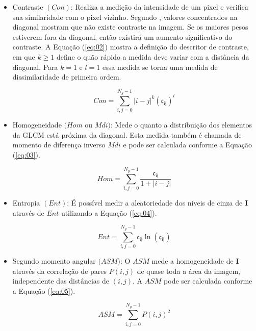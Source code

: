 \documentclass[a4paper]{ifacconf}
\begin{document}
\begin{itemize}
    \item Contraste $(Con)$: Realiza a medição da intensidade de um pixel e verifica sua similaridade com o pixel vizinho. Segundo \citep{Ramalho2013}, valores concentrados na diagonal mostram que não existe contraste na imagem. Se os maiores pesos estiverem fora da diagonal, então existirá um aumento significativo do contraste. A Equação (\ref{eq:02}) mostra a definição do descritor de contraste, em que $k \geq 1$ define o quão rápido a medida deve variar com a distância
    da diagonal. Para $k = 1$ e $l = 1$ essa medida se torna uma medida de dissimilaridade de primeira ordem.

    \begin{equation}\label{eq:02}
	    Con = \sum_{i,j = 0}^{N_g - 1} |i-j|^k (\mathfrak{c_{ij}})^l\
    \end{equation}   
 
    \item Homogeneidade $(Hom$ ou $Mdi)$: Mede o quanto a distribuição dos elementos da GLCM está próxima da diagonal. Esta medida também é chamada de momento de diferença inverso $Mdi$ e pode ser calculada conforme a Equação (\ref{eq:03}).
    
    \begin{equation}\label{eq:03}
	    Hom = \sum_{i,j = 0}^{N_g - 1} \frac{\mathfrak{c_{ij}}}{1 + |i-j|}\
    \end{equation}
    
    \item Entropia $(Ent)$: É possível medir a aleatoriedade dos níveis de cinza de \textbf{I} através de $Ent$ utilizando a Equação (\ref{eq:04}). 
    
     \begin{equation}\label{eq:04}
	    Ent = \sum_{i,j = 0}^{N_g - 1}{\mathfrak{c_{ij}}}\ln({\mathfrak{c_{ij}}})\
    \end{equation}
    
    \item Segundo momento angular $(ASM$): O $ASM$ mede a homogeneidade de \textbf{I} através da correlação de pares $P(i,j)$ de quase toda a área da imagem, independente das distâncias de $(i,j)$. A $ASM$ pode ser calculada conforme a Equação (\ref{eq:05}).
    
     \begin{equation}\label{eq:05}
	    ASM = \sum_{i,j = 0}^{N_g - 1} P(i,j)^2\
    \end{equation}
    
     \end{itemize}	
\end{document}
